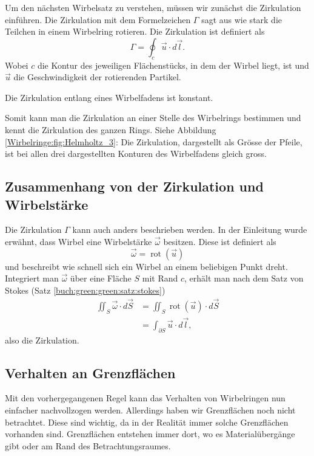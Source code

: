 Um den nächsten Wirbelsatz zu verstehen, müssen wir zunächst die Zirkulation einführen.
Die Zirkulation mit dem Formelzeichen \(\Gamma\) sagt aus wie stark die Teilchen in einem Wirbelring rotieren.
Die Zirkulation ist definiert als 
\[
\Gamma
= 
\oint_{c} \vec{u} \cdot d \vec{l}.
\]
Wobei \(c\) die Kontur des jeweiligen Flächenstücks, in dem der Wirbel liegt, ist und \(\vec{u}\) die Geschwindigkeit der rotierenden Partikel.

\begin{satz}
    \label{Wirbelringe:satz:wirbelsatz3}
    Die Zirkulation entlang eines Wirbelfadens ist konstant. 
\end{satz}

Somit kann man die Zirkulation an einer Stelle des Wirbelrings bestimmen und kennt die Zirkulation des ganzen Rings.
Siehe Abbildung \ref{Wirbelringe:fig:Helmholtz_3}: 
Die Zirkulation, dargestellt als Grösse der Pfeile, ist bei allen drei dargestellten Konturen des Wirbelfadens gleich gross.

\subsection{Zusammenhang von der Zirkulation und Wirbelstärke \label{Wirbelringe:Stokes}}

Die Zirkulation \(\Gamma\) kann auch anders beschrieben werden. 
In der Einleitung wurde erwähnt, dass Wirbel eine Wirbelstärke \(\vec{\omega}\) besitzen.
Diese ist definiert als
\[
\vec{\omega}
=
\operatorname{rot}(\vec{u})
\]
und beschreibt wie schnell sich ein Wirbel an einem beliebigen Punkt dreht.
Integriert man \(\vec{\omega}\) über eine Fläche \(S\) mit Rand \(c\), erhält man nach dem Satz von Stokes (Satz \ref{buch:green:green:satz:stokes})
\begin{align*}
\iint_{S} \vec{\omega} \cdot d \vec{S}
&=
\iint_{S} \operatorname{rot}(\vec{u})\cdot  d \vec{S}\\
&=
\int_{\partial S} \vec{u} \cdot d\vec{l},
\end{align*}
also die Zirkulation.

\subsection{Verhalten an Grenzflächen \label{Wirbelringe:Grenzflaechen}}

Mit den vorhergegangenen Regel kann das Verhalten von Wirbelringen nun einfacher nachvollzogen werden.
Allerdings haben wir Grenzflächen noch nicht betrachtet.
Diese sind wichtig, da in der Realität immer solche Grenzflächen vorhanden sind.
Grenzflächen entstehen immer dort, wo es Materialübergänge gibt oder am Rand des Betrachtungsraumes.

